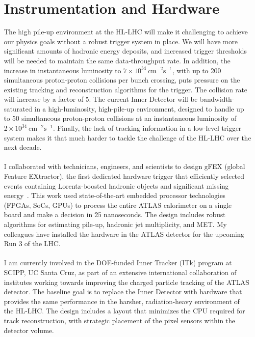 \documentclass[10pt,a4paper,sans]{moderncv} %
\begin{document}
\section{Instrumentation and Hardware}
The high pile-up environment at the HL-LHC will make it challenging to achieve our physics goals without a robust trigger system in place. We will have more significant amounts of hadronic energy deposits, and increased trigger thresholds will be needed to maintain the same data-throughput rate. In addition, the increase in instantaneous luminosity to $7 \times 10^{34}\ \mathrm{cm}^{-2}\mathrm{s}^{-1}$, with up to 200 simultaneous proton-proton collisions per bunch crossing, puts pressure on the existing tracking and reconstruction algorithms for the trigger. The collision rate will increase by a factor of 5. The current Inner Detector will be bandwidth-saturated in a high-luminosity, high-pile-up environment, designed to handle up to 50 simultaneous proton-proton collisions at an instantaneous luminosity of $2 \times 10^{34}\ \mathrm{cm}^{-2}\mathrm{s}^{-1}$. Finally, the lack of tracking information in a low-level trigger system makes it that much harder to tackle the challenge of the HL-LHC over the next decade.
\\
\\
I collaborated with technicians, engineers, and scientists to design gFEX (global Feature EXtractor), the first dedicated hardware trigger that efficiently selected events containing Lorentz-boosted hadronic objects and significant missing energy~\cite{Begel:2233958, Tang:2104248}. This work used state-of-the-art embedded processor technologies (FPGAs, SoCs, GPUs) to process the entire ATLAS calorimeter on a single board and make a decision in 25 nanoseconds. The design includes robust algorithms for estimating pile-up, hadronic jet multiplicity, and MET. My colleagues have installed the hardware in the ATLAS detector for the upcoming Run 3 of the LHC.
\\
\\
I am currently involved in the DOE-funded Inner Tracker (ITk) program at SCIPP, UC Santa Cruz, as part of an extensive international collaboration of institutes working towards improving the charged particle tracking of the ATLAS detector. The baseline goal is to replace the Inner Detector with hardware that provides the same performance in the harsher, radiation-heavy environment of the HL-LHC. The design includes a layout that minimizes the CPU required for track reconstruction, with strategic placement of the pixel sensors within the detector volume.
\end{document}
